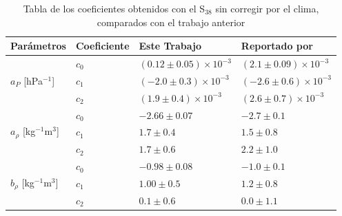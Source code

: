                \begin{table}[H]
                    \centering
                    \begin{tabular}{|l|l|l|l|}\hline
                     \textbf{Parámetros}						& \textbf{Coeficiente}	& \textbf{Este Trabajo} & Reportado por \textbf{ \cite{aab2017impact}}	\\ \hline
                     \multirow{3}{*}{$a_P$ [hPa$^{-1}$]}  		&  $c_0$				& $ (0.12\pm0.05)\times 10^{-3}$	    & $(2.1 \pm 0.09)\times 10^{-3} $	\\ \cline{2-4} %
                                                                &  $c_1$				& $ (-2.0\pm0.3)\times 10^{-3}$		& $(-2.6  \pm 0.6)\times 10^{-3} $	\\ \cline{2-4} 
                                                                &  $c_2$				& $ (1.9\pm0.4)\times 10^{-3}$		& $(2.6   \pm 0.7)\times 10^{-3} $	\\ \hline %
                    
                     \multirow{3}{*}{$a_\rho$ [kg$^{-1}$m$^3$]} &  $c_0$			& $-2.66   \pm 0.07$	& $ -2.7  \pm 0.1  $\\ \cline{2-4} 
                                                                 &  $c_1$			& $ 1.7    \pm 0.4 $	& $ 1.5   \pm 0.8  $\\ \cline{2-4} 
                                                                &  $c_2$			& $ 1.7    \pm 0.6 $	& $ 2.2   \pm 1.0  $\\ \hline %
                    
                    \multirow{3}{*}{$b_\rho$ [kg$^{-1}$m$^3$]} 	&  $c_0$			& $-0.98    \pm 0.08$	& $-1.0   \pm 0.1 $	\\ \cline{2-4} 
                                                                &  $c_1$			& $ 1.00    \pm 0.5$	& $ 1.2   \pm 0.8  $	\\ \cline{2-4} 
                                                                &  $c_2$			& $ 0.1    \pm 0.6$		& $ 0.0   \pm 1.1  $	\\ \hline 
                    
                    \end{tabular}	
                    \caption{Tabla de los coeficientes obtenidos con el S$_{38}$ sin corregir por el clima, comparados con el trabajo anterior} \label{tabla:cuadratica_ICRC_2019_S38}
                \end{table}



